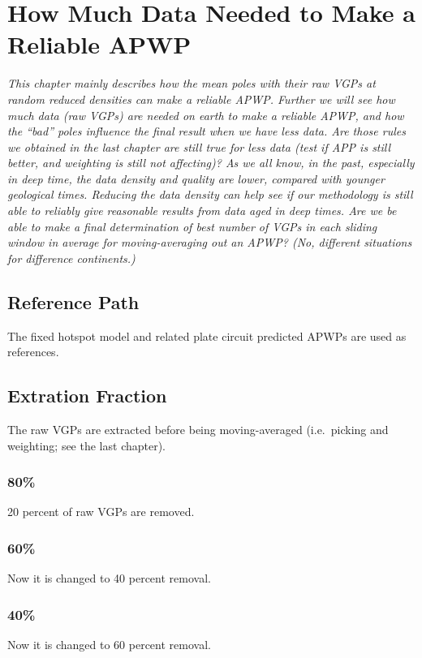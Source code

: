 \chapter{How Much Data Needed to Make a Reliable APWP}\label{chap:DatNeed}
\textit{This chapter mainly describes how the mean poles with their raw VGPs
at random reduced densities can make a reliable APWP\@. Further we will see how
much data (raw VGPs) are needed on earth to make a reliable APWP, and how the
``bad'' poles influence the final result when we have less data. Are those
rules we obtained in the last chapter are still true for less data (test if APP
is still better, and weighting is still not affecting)? As we all know, in the
past, especially in deep time, the data density and quality are lower, compared
with younger geological times. Reducing the data density can help see if our
methodology is still able to reliably give reasonable results from data aged in
deep times. Are we be able to make a final determination of best number of VGPs
in each sliding window in average for moving-averaging out an APWP? (No,
different situations for difference continents.)}
\vfill
\minitoc\newpage

\section{Reference Path}

The fixed hotspot model and related plate circuit predicted APWPs are used as
references.

\section{Extration Fraction}

The raw VGPs are extracted before being moving-averaged (i.e.\ picking and weighting;
see the last chapter).

\subsection{80\%}
20 percent of raw VGPs are removed.

\subsection{60\%}
Now it is changed to 40 percent removal.

\subsection{40\%}
Now it is changed to 60 percent removal.

